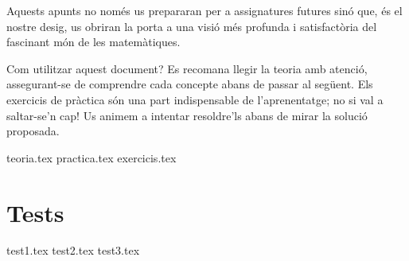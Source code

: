 \documentclass[12pt,a4paper,oneside]{book}
\theoremstyle{plain}
\theoremstyle{definition}
\theoremstyle{remark}
\numberwithin{equation}{section}
\begin{document}
Aquests apunts no nom\'{e}s us prepararan per a assignatures futures sin\'{o}
que, \'{e}s el nostre desig, us obriran la porta a una visi\'{o} m\'{e}s
profunda i satisfact\`{o}ria del fascinant m\'{o}n de les matem\`{a}tiques.

Com utilitzar aquest document? Es recomana llegir la teoria amb atenci\'{o},
assegurant-se de comprendre cada concepte abans de passar al seg\"{u}ent.
Els exercicis de pr\`{a}ctica s\'{o}n una part indispensable de
l'aprenentatge; no si val a saltar-se'n cap! Us animem a intentar
resoldre'ls abans de mirar la soluci\'{o} proposada.

\let\cleardoublepage\clearpage

\mainmatter

{teoria.tex} {practica.tex} %
{exercicis.tex}

\chapter{Tests}

\label{cap:tests}

{test1.tex} {test2.tex} %
{test3.tex}

\backmatter
\end{document}
